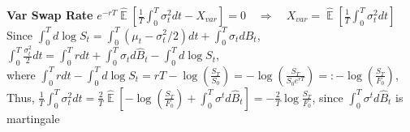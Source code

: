 \documentclass[12pt,landscape, a4paper]{article}
\theoremstyle{remark}
\newcommand{\E}{\operatorname{\mathbb{E}}}
\begin{document}
\begin{multicols*}{3}
\textbf{Var Swap Rate} $e^{-rT} \hat{\E} \left[\frac{1}{T} \int^T_0 \sigma^2_t dt - X_{var} \right] = 0 \quad \Rightarrow \quad X_{var} = \hat{\E} \left[\frac{1}{T} \int^T_0 \sigma^2_t dt \right]$\\
Since $\int^T_0 d \log S_t = \int^T_0 \left(\mu_t - \sigma^2_t/2 \right) dt + \int^T_0 \sigma_t d B_t $, $ \int^T_0 \frac{\sigma^2_t}{2} dt = \int^T_0 r dt + \int^T_0 \sigma_t d \hat{B}_t - \int^T_0 d\log S_t$,\\
where $\int^T_0 r dt- \int^T_0 d\log S_t = rT - \log \left(\frac{S_T}{S_0} \right) = -\log \left(\frac{S_T}{S_0 e^{rT}} \right) =: -\log \left(\frac{S_T}{F_0} \right) $,\\
Thus, $\frac{1}{T} \int^T_0 \sigma^2_t dt = \frac{2}{T} \hat{\E} \left[-\log \left(\frac{S_T}{F_0} \right)  + \int^T_0 \sigma^t d \hat{B}_t \right] = -\frac{2}{T} \log \frac{S_T}{F_0}$, since $\int^T_0 \sigma^t d \hat{B}_t$ is martingale\\


\end{multicols*}
\end{document}

